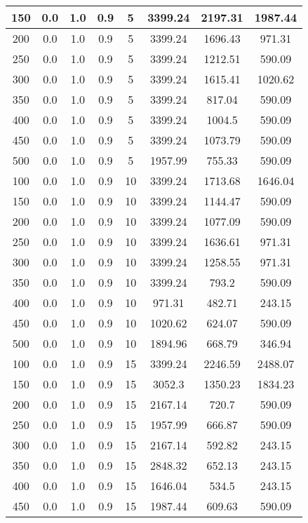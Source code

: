\documentclass[a4paper, 12pt]{extreport}
\begin{document}
\begin{itemize}
\begin{longtable}{|c|c|c|c|c|c|c|c|}
			150 & 0.0 & 1.0 & 0.9 & 5 & 3399.24 & 2197.31 & 1987.44 \\\hline
			200 & 0.0 & 1.0 & 0.9 & 5 & 3399.24 & 1696.43 & 971.31 \\\hline
			250 & 0.0 & 1.0 & 0.9 & 5 & 3399.24 & 1212.51 & 590.09 \\\hline
			300 & 0.0 & 1.0 & 0.9 & 5 & 3399.24 & 1615.41 & 1020.62 \\\hline
			350 & 0.0 & 1.0 & 0.9 & 5 & 3399.24 & 817.04 & 590.09 \\\hline
			400 & 0.0 & 1.0 & 0.9 & 5 & 3399.24 & 1004.5 & 590.09 \\\hline
			450 & 0.0 & 1.0 & 0.9 & 5 & 3399.24 & 1073.79 & 590.09 \\\hline
			500 & 0.0 & 1.0 & 0.9 & 5 & 1957.99 & 755.33 & 590.09 \\\hline
			100 & 0.0 & 1.0 & 0.9 & 10 & 3399.24 & 1713.68 & 1646.04 \\\hline
			150 & 0.0 & 1.0 & 0.9 & 10 & 3399.24 & 1144.47 & 590.09 \\\hline
			200 & 0.0 & 1.0 & 0.9 & 10 & 3399.24 & 1077.09 & 590.09 \\\hline
			250 & 0.0 & 1.0 & 0.9 & 10 & 3399.24 & 1636.61 & 971.31 \\\hline
			300 & 0.0 & 1.0 & 0.9 & 10 & 3399.24 & 1258.55 & 971.31 \\\hline
			350 & 0.0 & 1.0 & 0.9 & 10 & 3399.24 & 793.2 & 590.09 \\\hline
			400 & 0.0 & 1.0 & 0.9 & 10 & 971.31 & 482.71 & 243.15 \\\hline
			450 & 0.0 & 1.0 & 0.9 & 10 & 1020.62 & 624.07 & 590.09 \\\hline
			500 & 0.0 & 1.0 & 0.9 & 10 & 1894.96 & 668.79 & 346.94 \\\hline
			100 & 0.0 & 1.0 & 0.9 & 15 & 3399.24 & 2246.59 & 2488.07 \\\hline
			150 & 0.0 & 1.0 & 0.9 & 15 & 3052.3 & 1350.23 & 1834.23 \\\hline
			200 & 0.0 & 1.0 & 0.9 & 15 & 2167.14 & 720.7 & 590.09 \\\hline
			250 & 0.0 & 1.0 & 0.9 & 15 & 1957.99 & 666.87 & 590.09 \\\hline
			300 & 0.0 & 1.0 & 0.9 & 15 & 2167.14 & 592.82 & 243.15 \\\hline
			350 & 0.0 & 1.0 & 0.9 & 15 & 2848.32 & 652.13 & 243.15 \\\hline
			400 & 0.0 & 1.0 & 0.9 & 15 & 1646.04 & 534.5 & 243.15 \\\hline
			450 & 0.0 & 1.0 & 0.9 & 15 & 1987.44 & 609.63 & 590.09 \\\hline

\end{longtable}
\end{itemize}
\end{document}

